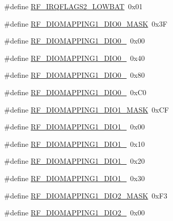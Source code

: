 \begin{DoxyCompactItemize}
\item 
\#define \mbox{\hyperlink{sx1276_regs-_fsk_8h_a2849a01d5fe3f3476fb31a7ac8e5e34a}{R\+F\+\_\+\+I\+R\+Q\+F\+L\+A\+G\+S2\+\_\+\+L\+O\+W\+B\+AT}}~0x01
\item 
\#define \mbox{\hyperlink{sx1276_regs-_fsk_8h_a9be88c0f522b9fb1e8a43008a84cb4e5}{R\+F\+\_\+\+D\+I\+O\+M\+A\+P\+P\+I\+N\+G1\+\_\+\+D\+I\+O0\+\_\+\+M\+A\+SK}}~0x3F
\item 
\#define \mbox{\hyperlink{sx1276_regs-_fsk_8h_a848521495c2f6025a438a89cd4fe7943}{R\+F\+\_\+\+D\+I\+O\+M\+A\+P\+P\+I\+N\+G1\+\_\+\+D\+I\+O0\+\_}}~0x00
\item 
\#define \mbox{\hyperlink{sx1276_regs-_fsk_8h_a63c7ef74ba01cd3e1552814d638f32fd}{R\+F\+\_\+\+D\+I\+O\+M\+A\+P\+P\+I\+N\+G1\+\_\+\+D\+I\+O0\+\_}}~0x40
\item 
\#define \mbox{\hyperlink{sx1276_regs-_fsk_8h_abc31a276fae19b01be5eb3f8705cd793}{R\+F\+\_\+\+D\+I\+O\+M\+A\+P\+P\+I\+N\+G1\+\_\+\+D\+I\+O0\+\_}}~0x80
\item 
\#define \mbox{\hyperlink{sx1276_regs-_fsk_8h_a9ff81336dba9556766eab5557d307c61}{R\+F\+\_\+\+D\+I\+O\+M\+A\+P\+P\+I\+N\+G1\+\_\+\+D\+I\+O0\+\_}}~0x\+C0
\item 
\#define \mbox{\hyperlink{sx1276_regs-_fsk_8h_aa92615e9def963f8881f657746524eac}{R\+F\+\_\+\+D\+I\+O\+M\+A\+P\+P\+I\+N\+G1\+\_\+\+D\+I\+O1\+\_\+\+M\+A\+SK}}~0x\+CF
\item 
\#define \mbox{\hyperlink{sx1276_regs-_fsk_8h_abd43e3d4350c26e574afbde538b06ad6}{R\+F\+\_\+\+D\+I\+O\+M\+A\+P\+P\+I\+N\+G1\+\_\+\+D\+I\+O1\+\_}}~0x00
\item 
\#define \mbox{\hyperlink{sx1276_regs-_fsk_8h_a0740d4eea50feddedcc9c16f2bea4b46}{R\+F\+\_\+\+D\+I\+O\+M\+A\+P\+P\+I\+N\+G1\+\_\+\+D\+I\+O1\+\_}}~0x10
\item 
\#define \mbox{\hyperlink{sx1276_regs-_fsk_8h_aa3a59a62b71ccad95afea471eb8d51b2}{R\+F\+\_\+\+D\+I\+O\+M\+A\+P\+P\+I\+N\+G1\+\_\+\+D\+I\+O1\+\_}}~0x20
\item 
\#define \mbox{\hyperlink{sx1276_regs-_fsk_8h_a5c6e8e60356b10f7742d5dc73ddd03af}{R\+F\+\_\+\+D\+I\+O\+M\+A\+P\+P\+I\+N\+G1\+\_\+\+D\+I\+O1\+\_}}~0x30
\item 
\#define \mbox{\hyperlink{sx1276_regs-_fsk_8h_a428631edbba8ef725a4a6b3be1b6fb8a}{R\+F\+\_\+\+D\+I\+O\+M\+A\+P\+P\+I\+N\+G1\+\_\+\+D\+I\+O2\+\_\+\+M\+A\+SK}}~0x\+F3
\item 
\#define \mbox{\hyperlink{sx1276_regs-_fsk_8h_a6db6d0433fa092c1c499001f8b5a3a1a}{R\+F\+\_\+\+D\+I\+O\+M\+A\+P\+P\+I\+N\+G1\+\_\+\+D\+I\+O2\+\_}}~0x00

\end{DoxyCompactItemize}
